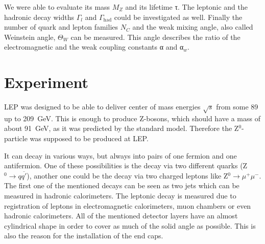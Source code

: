 \documentclass[epj,nopacs]{svjour}
\begin{document}
We were able to evaluate its mass $M_Z$ and its lifetime τ. The leptonic and
the hadronic decay widths $Γ_l$ and $Γ_{\mathrm{had}}$ could be investigated as
well. Finally
the number of quark and lepton families $N_C$ and the weak mixing angle, also
called Weinstein angle, $\Theta_W$ can be measured. This angle describes the
ratio of the electromagnetic and the weak coupling constants α and α$_w$.

\section{ Experiment}

LEP was designed to be able to deliver center of mass energies $\sqrt{s}$ from
some 89 up to \SI{209}{\giga\electronvolt}. This is enough to produce Z-bosons,
which should have a mass of about \SI{91}{\giga\electronvolt}, as it was
predicted by the standard model. Therefore the Z$^0$-particle was supposed to be
produced at LEP.

It can decay in various ways, but always into pairs of one
fermion and one antifermion. One of these possibilities is the decay via two
different quarks (Z$^0→q\overline{q'}$), another one could be the decay via two
charged leptons like Z$^0→ μ^+μ^-$. The first one of the mentioned decays can be
seen as two jets which can be measured in hadronic calorimeters. The leptonic
decay is measured due to registration of leptons in electromagnetic
calorimeters, muon chambers or even hadronic calorimeters. All of the mentioned
detector layers have an almost cylindrical shape in order to
cover as much of the solid angle as possible. This is also the reason for the
installation of the end caps.
\end{document}
